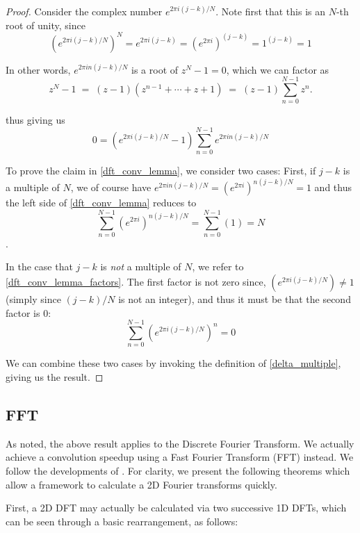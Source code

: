 \begin{proof}

Consider the complex number $e^{2\pi i (j-k)/N}$. Note first that this is an $N$-th root of unity, since
\[
\left(e^{2\pi i (j-k)/N}\right)^N = e^{2\pi i (j-k)} = \left(e^{2\pi i}\right)^{(j-k)}
= 1^{(j-k)} = 1
\]

In other words, $e^{2\pi i n(j-k)/N}$ is a root of $z^N -1 = 0$, which we can factor as
\begin{equation}
z^N -1 \;=\; (z-1)\left(z^{n-1} + \cdots + z + 1\right) \;=\; (z-1)\sum_{n=0}^{N-1} z^n .
\end{equation}

thus giving us
\begin{equation} \label{dft_conv_lemma_factors}
0 = \left(e^{2\pi i(j-k)/N} - 1\right) \sum_{n=0}^{N-1} e^{2\pi i n(j-k)/N}
\end{equation}

To prove the claim in \cref{dft_conv_lemma}, we consider two cases: First, if $j-k$ is a multiple of $N$, we of course have $e^{2\pi i n(j-k)/N} = \left(e^{2\pi i}\right)^{n(j-k)/N} = 1$  and thus the left side of \cref{dft_conv_lemma} reduces to 
\[
\sum_{n=0}^{N-1} \left(e^{2\pi i}\right)^{n(j-k)/N} = \sum_{n=0}^{N-1} \left(1\right) = N
\].

In the case that $j-k$ is \textit{not} a multiple of $N$, we refer to \cref{dft_conv_lemma_factors}.
The first factor is not zero since, $\left(e^{2\pi i (j-k)/N}\right) \ne 1$ (simply since $(j-k)/N$ is not an integer), and thus it must be that the second factor is 0:
\[
\sum_{n=0}^{N-1} \left(e^{2\pi i (j-k)/N}\right)^n = 0
\]

We can combine these two cases by invoking the definition of \cref{delta_multiple}, giving us the result.
\end{proof}
		
\subsection{FFT}
As noted, the above result applies to the Discrete Fourier Transform. We actually achieve a convolution speedup using a Fast Fourier Transform (FFT) instead. We follow the developments of \cite{DIPGW}.
For clarity, we present the following theorems which allow a framework to calculate a 2D Fourier transforms quickly.


First, a 2D DFT may actually be calculated via two successive 1D DFTs, which can be
seen through a basic rearrangement, as follows:

